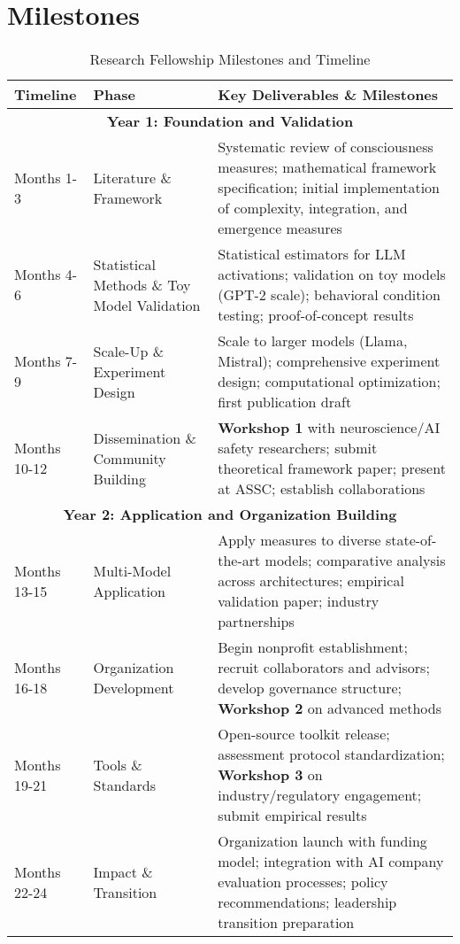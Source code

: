\documentclass[11pt,a4paper]{article}
\begin{document}
\section{Milestones}
\begin{table}[!htbp]
    \centering
    \small
    \begin{tabular}{|p{2cm}|p{3.5cm}|p{7.5cm}|}
    \hline
    \textbf{Timeline} & \textbf{Phase} & \textbf{Key Deliverables \& Milestones} \\
    \hline
    \multicolumn{3}{|c|}{\textbf{Year 1: Foundation and Validation}} \\
    \hline
    Months 1-3 & Literature \& Framework & 
    Systematic review of consciousness measures; mathematical framework specification; initial implementation of complexity, integration, and emergence measures \\
    \hline
    Months 4-6 & Statistical Methods \& Toy Model Validation & 
    Statistical estimators for LLM activations; validation on toy models (GPT-2 scale); behavioral condition testing; proof-of-concept results \\
    \hline
    Months 7-9 & Scale-Up \& Experiment Design & 
    Scale to larger models (Llama, Mistral); comprehensive experiment design; computational optimization; first publication draft \\
    \hline
    Months 10-12 & Dissemination \& Community Building & 
    \textbf{Workshop 1} with neuroscience/AI safety researchers; submit theoretical framework paper; present at ASSC; establish collaborations \\
    \hline
    \multicolumn{3}{|c|}{\textbf{Year 2: Application and Organization Building}} \\
    \hline
    Months 13-15 & Multi-Model Application & 
    Apply measures to diverse state-of-the-art models; comparative analysis across architectures; empirical validation paper; industry partnerships \\
    \hline
    Months 16-18 & Organization Development & 
    Begin nonprofit establishment; recruit collaborators and advisors; develop governance structure; \textbf{Workshop 2} on advanced methods \\
    \hline
    Months 19-21 & Tools \& Standards & 
    Open-source toolkit release; assessment protocol standardization; \textbf{Workshop 3} on industry/regulatory engagement; submit empirical results \\
    \hline
    Months 22-24 & Impact \& Transition & 
    Organization launch with funding model; integration with AI company evaluation processes; policy recommendations; leadership transition preparation \\
    \hline
    \end{tabular}
    \caption{Research Fellowship Milestones and Timeline}
    \label{tab:milestones}
    \end{table}
\end{document}
